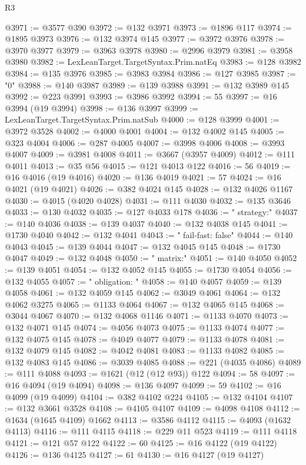 \begin{lexlean}{R3}
\begin{coremodule}
@3971 := @3577 @390
@3972 := @132 @3971
@3973 := @1896 @117
@3974 := @1895 @3973
@3976 := @132 @3974 @145
@3977 := @3972 @3976
@3978 := @3970 @3977
@3979 := @3963 @3978
@3980 := @2996 @3979
@3981 := @3958 @3980
@3982 := LexLeanTarget.TargetSyntax.Prim.natEq
@3983 := @128 @3982
@3984 := @135 @3976
@3985 := @3983 @3984
@3986 := @127 @3985
@3987 := "0"
@3988 := @140 @3987
@3989 := @139 @3988
@3991 := @132 @3989 @145
@3992 := @223 @3991
@3993 := @3986 @3992
@3994 := 55
@3997 := @16 @3994 (@19 @3994)
@3998 := @136 @3997
@3999 := LexLeanTarget.TargetSyntax.Prim.natSub
@4000 := @128 @3999
@4001 := @3972 @3528
@4002 := @4000 @4001
@4004 := @132 @4002 @145
@4005 := @323 @4004
@4006 := @287 @4005
@4007 := @3998 @4006
@4008 := @3993 @4007
@4009 := @3981 @4008
@4011 := @3667 (@3957 @4009)
@4012 := @111 @4011
@4013 := @35 @56
@4015 := @121 @4013 @122
@4016 := 56
@4019 := @16 @4016 (@19 @4016)
@4020 := @136 @4019
@4021 := 57
@4024 := @16 @4021 (@19 @4021)
@4026 := @382 @4024 @145
@4028 := @132 @4026 @1167
@4030 := @4015 (@4020 @4028)
@4031 := @111 @4030
@4032 := @135 @3646
@4033 := @130 @4032
@4035 := @127 @4033 @178
@4036 := "    strategy:"
@4037 := @140 @4036
@4038 := @139 @4037
@4040 := @132 @4038 @145
@4041 := @1730 @4040
@4042 := @132 @4041
@4043 := "      fail-fast: false"
@4044 := @140 @4043
@4045 := @139 @4044
@4047 := @132 @4045 @145
@4048 := @1730 @4047
@4049 := @132 @4048
@4050 := "      matrix:"
@4051 := @140 @4050
@4052 := @139 @4051
@4054 := @132 @4052 @145
@4055 := @1730 @4054
@4056 := @132 @4055
@4057 := "        obligation: "
@4058 := @140 @4057
@4059 := @139 @4058
@4061 := @132 @4059 @145
@4062 := @3049 @4061
@4064 := @132 @4062 @3275
@4065 := @1133 @4064
@4067 := @132 @4065 @145
@4068 := @3044 @4067
@4070 := @132 @4068 @1146
@4071 := @1133 @4070
@4073 := @132 @4071 @145
@4074 := @4056 @4073
@4075 := @1133 @4074
@4077 := @132 @4075 @145
@4078 := @4049 @4077
@4079 := @1133 @4078
@4081 := @132 @4079 @145
@4082 := @4042 @4081
@4083 := @1133 @4082
@4085 := @132 @4083 @145
@4086 := @3039 @4085
@4088 := @221 (@4035 @4086)
@4089 := @111 @4088
@4093 := @1621 (@12 (@12 @93)) @122
@4094 := 58
@4097 := @16 @4094 (@19 @4094)
@4098 := @136 @4097
@4099 := 59
@4102 := @16 @4099 (@19 @4099)
@4104 := @382 @4102 @224
@4105 := @132 @4104
@4107 := @132 @3661 @3528
@4108 := @4105 @4107
@4109 := @4098 @4108
@4112 := @1634 (@1645 @4109) @1662
@4113 := @3586 @4112
@4115 := @4093 (@1632 @4113)
@4116 := @111 @4115
@4118 := @229 @11 @523
@4119 := @111 @4118
@4121 := @121 @57 @122
@4122 := 60
@4125 := @16 @4122 (@19 @4122)
@4126 := @136 @4125
@4127 := 61
@4130 := @16 @4127 (@19 @4127)

\end{coremodule}
\end{lexlean}
